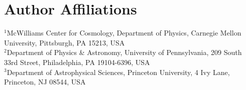 \documentclass{openjournal}
\begin{document}
\section*{Author Affiliations}

\noindent $^1$McWilliams Center for Cosmology, Department of Physics, Carnegie Mellon University, Pittsburgh, PA 15213, USA \\
$^2$Department of Physics \& Astronomy, University of Pennsylvania, 209 South 33rd Street, Philadelphia, PA 19104-6396, USA\\
$^3$Department of Astrophysical Sciences, Princeton University, 4 Ivy Lane, Princeton, NJ 08544, USA\\


  
\end{document}
